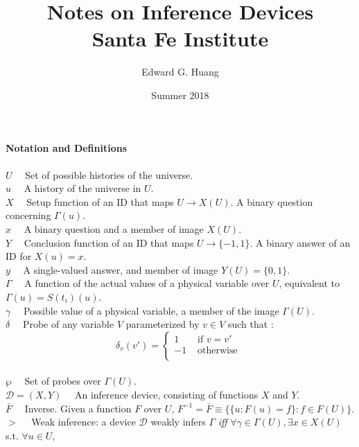 \documentclass[11pt]{article}
\title{
  Notes on Inference Devices \\
  \large Santa Fe Institute}
\author{Edward G. Huang}
\date{Summer 2018}
\begin{document}
\maketitle 


\textbf{Notation and Definitions} \\
\\
$ U \quad $ Set of possible histories of the universe. \\
$ u \quad $ A history of the universe in $ U $. \\ 
$ X \quad $ Setup function of an ID that maps $ U \rightarrow X(U) $. A binary question concerning $ \Gamma(u) $. \\
$ x \quad $ A binary question and a member of image $ X(U) $. \\ 
$ Y \quad $ Conclusion function of an ID that maps $ U \rightarrow \{-1, 1\} $. A binary answer of an ID for  $ X(u) = x $. \\ 
$ y \quad $ A single-valued answer, and member of image $ Y(U)  = \{0, 1\} $. \\ 
$ \Gamma \quad $ A function of the actual values of a physical variable over $U$, equivalent to $\Gamma(u) = S(t_i)(u)$.  \\
$ \gamma \quad $ Possible value of a physical variable, a member of the image $\Gamma(U)$. \\
$ \delta \quad $ Probe of any variable $V$ parameterized by $v \in V$ such that : 
	  \[ \delta_v (v') =
	  \begin{cases} 
       1 & \text{ if } v = v' \\
       -1 & \text{ otherwise } \\
      \end{cases}\] \\
$ \wp \quad $ Set of probes over $\Gamma(U)$. \\
$ \mathcal{D} = (X, Y) \quad $ An inference device, consisting of functions $ X $ and $ Y $. \\
$ \bar{F} \quad $ Inverse. Given a function $ F $ over $ U $, $F ^ {-1} = \bar{F} \equiv \{\{u : F(u) = f \} : f \in F(U) \} $. \\
$ > \quad $ Weak inference: a device $\mathcal{D}$ weakly infers $\Gamma$ \textit{iff} $ \forall \gamma \in \Gamma(U), \exists x \in X(U) $ s.t. $ \forall u \in U $, 
\end{document}
